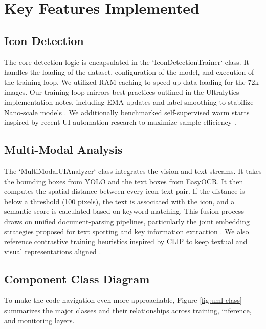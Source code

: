 \documentclass[11pt,a4paper]{report}
\begin{document}
\section{Key Features Implemented}

\subsection{Icon Detection}
The core detection logic is encapsulated in the `IconDetectionTrainer` class. It handles the loading of the dataset, configuration of the model, and execution of the training loop. We utilized RAM caching to speed up data loading for the 72k images.
Our training loop mirrors best practices outlined in the Ultralytics implementation notes, including EMA updates and label smoothing to stabilize Nano-scale models \cite{yolov11}. We additionally benchmarked self-supervised warm starts inspired by recent UI automation research to maximize sample efficiency \cite{uiautomation}.

\subsection{Multi-Modal Analysis}
The `MultiModalUIAnalyzer` class integrates the vision and text streams. It takes the bounding boxes from YOLO and the text boxes from EasyOCR. It then computes the spatial distance between every icon-text pair. If the distance is below a threshold (100 pixels), the text is associated with the icon, and a semantic score is calculated based on keyword matching.
This fusion process draws on unified document-parsing pipelines, particularly the joint embedding strategies proposed for text spotting and key information extraction \cite{unifiedtext}. We also reference contrastive training heuristics inspired by CLIP to keep textual and visual representations aligned \cite{clip}.

\subsection{Component Class Diagram}
To make the code navigation even more approachable, Figure \ref{fig:uml-class} summarizes the major classes and their relationships across training, inference, and monitoring layers.
\end{document}
